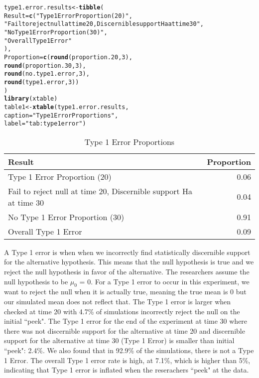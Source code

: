 \documentclass{article}\usepackage[]{graphicx}\usepackage[]{xcolor}
\makeatletter
\newcommand{\hlnum}[1]{\textcolor[rgb]{0.686,0.059,0.569}{#1}}%
\newcommand{\hlsng}[1]{\textcolor[rgb]{0.192,0.494,0.8}{#1}}%
\newcommand{\hldef}[1]{\textcolor[rgb]{0.345,0.345,0.345}{#1}}%
\newcommand{\hlkwb}[1]{\textcolor[rgb]{0.69,0.353,0.396}{#1}}%
\newcommand{\hlkwc}[1]{\textcolor[rgb]{0.333,0.667,0.333}{#1}}%
\newcommand{\hlkwd}[1]{\textcolor[rgb]{0.737,0.353,0.396}{\textbf{#1}}}%
\newenvironment{kframe}{%
 \def\at@end@of@kframe{}%
 \ifinner\ifhmode%
  \def\at@end@of@kframe{\end{minipage}}%
  \begin{minipage}{\columnwidth}%
 \fi\fi%
 \def\FrameCommand##1{\hskip\@totalleftmargin \hskip-\fboxsep
 \colorbox{shadecolor}{##1}\hskip-\fboxsep
     \hskip-\linewidth \hskip-\@totalleftmargin \hskip\columnwidth}%
 \MakeFramed {\advance\hsize-\width
   \@totalleftmargin\z@ \linewidth\hsize
   \@setminipage}}%
 {\par\unskip\endMakeFramed%
 \at@end@of@kframe}
\newenvironment{knitrout}{}{} %
\makeatother
\begin{document}
\begin{enumerate}
\begin{enumerate}
\begin{knitrout}
\begin{kframe}
\begin{alltt}
\hldef{type1.error.results} \hlkwb{<-} \hlkwd{tibble}\hldef{(}
  \hlkwc{Result} \hldef{=} \hlkwd{c}\hldef{(}\hlsng{"Type 1 Error Proportion (20)"}\hldef{,}
             \hlsng{"Fail to reject null at time 20, Discernible support Ha at time 30"}\hldef{,}
             \hlsng{"No Type 1 Error Proportion (30)"}\hldef{,}
             \hlsng{"Overall Type 1 Error"}
             \hldef{),}
  \hlkwc{Proportion} \hldef{=} \hlkwd{c}\hldef{(}\hlkwd{round}\hldef{(proportion.20,}\hlnum{3}\hldef{),}
                 \hlkwd{round}\hldef{(proportion.30,}\hlnum{3}\hldef{),}
                 \hlkwd{round}\hldef{(no.type1.error,}\hlnum{3}\hldef{),}
                 \hlkwd{round}\hldef{(type1.error,}\hlnum{3}\hldef{))}
\hldef{)}
\hlkwd{library}\hldef{(xtable)}
\hldef{table1} \hlkwb{<-} \hlkwd{xtable}\hldef{(type1.error.results,}
                 \hlkwc{caption} \hldef{=} \hlsng{"Type 1 Error Proportions"}\hldef{,}
                 \hlkwc{label} \hldef{=} \hlsng{"tab:type1error"}\hldef{)}
\end{alltt}
\end{kframe}
\end{knitrout}
\begin{table}[H]
\centering
\begingroup\small
\begin{tabular}{lr}
  \hline
Result & Proportion \\ 
  \hline
Type 1 Error Proportion (20) & 0.06 \\ 
  Fail to reject null at time 20, Discernible support Ha at time 30 & 0.04 \\ 
  No Type 1 Error Proportion (30) & 0.91 \\ 
  Overall Type 1 Error & 0.09 \\ 
   \hline
\end{tabular}
\endgroup
\caption{Type 1 Error Proportions} 
\label{tab:type1error}
\end{table}

A Type 1 error is when when we incorrectly find statistically discernible support for the alternative hypothesis. This means that the null hypothesis is true and we reject the null hypothesis in favor of the alternative. The researchers assume the null hypothesis to be $\mu_{0}$ = 0. For a Type 1 error to occur in this experiment, we want to reject the null when it is actually true, meaning the true mean is 0 but our simulated mean does not reflect that. The Type 1 error is larger when checked at time 20 with 4.7\% of simulations incorrectly reject the null on the initial ``peek". The Type 1 error for the end of the experiment at time 30 where there was not discernible support for the alternative at time 20 and discernible support for the alternative at time 30 (Type 1 Error) is smaller than initial ``peek": 2.4\%.
We also found that in 92.9\% of the simulations, there is not a Type 1 Error. The overall Type 1 error rate is high, at 7.1\%, which is higher than 5\%, indicating that Type 1 error is inflated when the reserachers ``peek" at the data.


\end{enumerate}
\end{enumerate}
\end{document}

